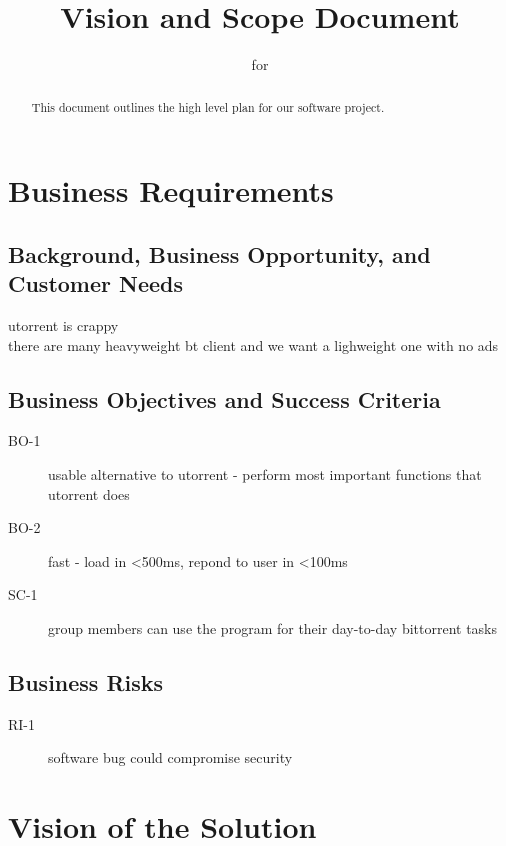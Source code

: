 \documentclass[letter]{scrartcl}
\newcommand{\app}{\sc{393torrent}}
\begin{document}
\title{Vision and Scope Document}
\subtitle{for \app}
\date{} %

\maketitle

\begin{abstract}
This document outlines the high level plan for our software project.
\end{abstract}

\tableofcontents
\pagebreak

\section{Business Requirements}
\subsection{Background, Business Opportunity, and Customer Needs}
utorrent is crappy \\
there are many heavyweight bt client and we want a lighweight one with no ads

\subsection{Business Objectives and Success Criteria}
\begin{description}
\item[BO-1] usable alternative to utorrent - perform most important functions that utorrent does
\item[BO-2] fast - load in \textless500ms, repond to user in \textless100ms
\\
\item[SC-1] group members can use the program for their day-to-day bittorrent tasks
\end{description}

\subsection{Business Risks}
\begin{description}
\item[RI-1] software bug could compromise security
\end{description}


\section{Vision of the Solution}
\end{document}
